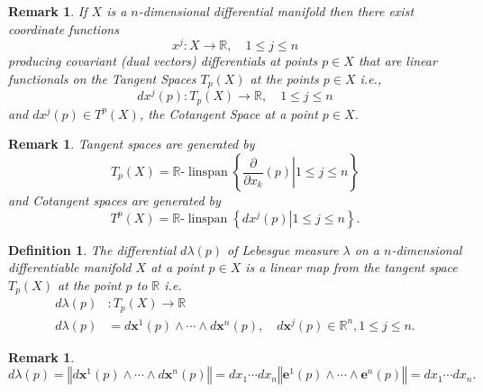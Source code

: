 \documentclass[aps,preprint]{revtex4}%
\newtheorem{definition}[theorem]{Definition}
\newtheorem{remark}[theorem]{Remark}
\begin{document}
\begin{remark}
If $X$ is a $n$-dimensional differential manifold then there exist coordinate
functions
\begin{equation}
x^{j}:X\rightarrow\mathbb{R},\quad1\leq j\leq n
\end{equation}
producing covariant (dual vectors) differentials at points $p\in X$ that are
linear functionals on the \emph{Tangent Spaces} $T_{p}\left(  X\right)  $ at
the points $p\in X$ i.e.,
\begin{equation}
dx^{j}\left(  p\right)  :T_{p}\left(  X\right)  \rightarrow\mathbb{R}%
,\quad1\leq j\leq n
\end{equation}
and $dx^{j}\left(  p\right)  \in T^{p}\left(  X\right)  $, the \emph{Cotangent
Space} at a point $p\in X$.
\end{remark}

\begin{remark}
Tangent spaces are generated by
\begin{equation}
T_{p}\left(  X\right)  =\mathbb{R}\text{-}\operatorname*{linspan}\left\{
\left.  \frac{\partial}{\partial x_{k}}\left(  p\right)  \right\vert 1\leq
j\leq n\right\}
\end{equation}
and Cotangent spaces are generated by
\begin{equation}
T^{p}\left(  X\right)  =\mathbb{R}\text{-}\operatorname*{linspan}\left\{
\left.  dx^{j}\left(  p\right)  \right\vert 1\leq j\leq n\right\}  .
\end{equation}

\end{remark}

\begin{definition}
The \emph{differential }$d\lambda\left(  p\right)  $\emph{ of Lebesgue
measure} $\lambda$ on a $n$-dimensional differentiable manifold $X$ at a point
$p\in X$ is a linear map from the tangent space $T_{p}\left(  X\right)  $ at
the point $p$ to $\mathbb{R}$ i.e.
\begin{align}
d\lambda\left(  p\right)   &  :T_{p}\left(  X\right)  \rightarrow\mathbb{R}\\
d\lambda\left(  p\right)   &  =d\mathbf{x}^{1}\left(  p\right)  \wedge
\cdots\wedge d\mathbf{x}^{n}\left(  p\right)  ,\quad d\mathbf{x}^{j}\left(
p\right)  \in\mathbb{R}^{n},1\leq j\leq n.
\end{align}

\end{definition}

\begin{remark}%
\begin{equation}
d\lambda\left(  p\right)  =\left\Vert d\mathbf{x}^{1}\left(  p\right)
\wedge\cdots\wedge d\mathbf{x}^{n}\left(  p\right)  \right\Vert =dx_{1}\cdots
dx_{n}\left\Vert \mathbf{e}^{1}\left(  p\right)  \wedge\cdots\wedge
\mathbf{e}^{n}\left(  p\right)  \right\Vert =dx_{1}\cdots dx_{n}.
\end{equation}

\end{remark}
\end{document}
